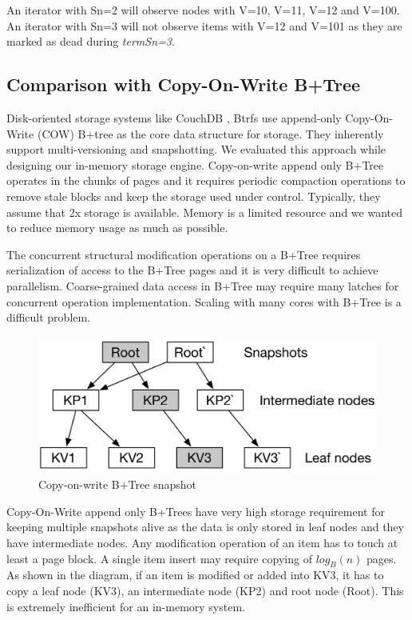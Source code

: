 \documentclass{vldb}
\begin{document}
 An iterator with Sn=2 will observe nodes with V=10, V=11, V=12 and V=100. An iterator with Sn=3 will not observe items with V=12 and V=101 as they are marked as dead during \textit{termSn=3}.

\subsection{Comparison with Copy-On-Write B+Tree}
Disk-oriented storage systems like CouchDB \cite{couchdb}, Btrfs \cite{btrfs} use append-only Copy-On-Write (COW) B+tree as the core data structure for storage. They inherently support multi-versioning and snapshotting. We evaluated this approach while designing our in-memory storage engine. Copy-on-write append only B+Tree operates in the chunks of pages and it requires periodic compaction operations to remove stale blocks and keep the storage used under control. Typically, they assume that 2x storage is available. Memory is a limited resource and we wanted to reduce memory usage as much as possible.

The concurrent structural modification operations on a B+Tree requires serialization of access to the B+Tree pages and it is very difficult to achieve parallelism. Coarse-grained data access in B+Tree may require many latches for concurrent operation implementation. Scaling with many cores with B+Tree is a difficult problem.


 \begin{figure}[H]
\includegraphics[scale=0.5]{images/fig-6}
\caption{Copy-on-write B+Tree snapshot}
\label{fig:btree-cow}
\end{figure}

Copy-On-Write append only B+Trees have very high storage requirement for keeping multiple snapshots alive as the data is only stored in leaf nodes and they have intermediate nodes. Any modification operation of an item has to touch at least a page block. A single item insert may require copying of  $log_B (n)$ pages. As shown in the diagram, if an item is modified or added into KV3, it has to copy a leaf node (KV3), an intermediate node (KP2) and root node (Root). This is extremely inefficient for an in-memory system. 
\end{document}
